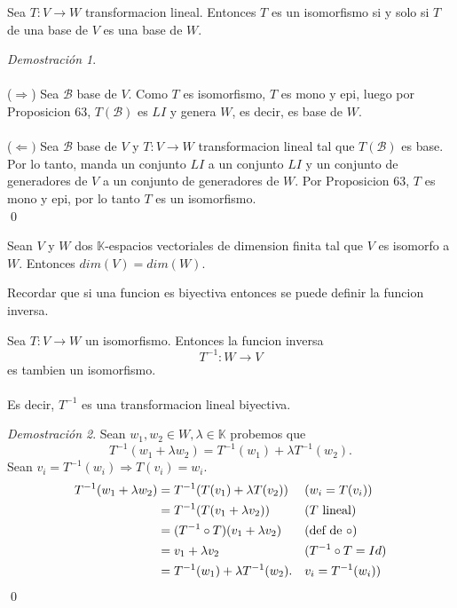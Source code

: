 \documentclass{article}
\theoremstyle{definition}
\theoremstyle{definition}
\theoremstyle{remark}
\newtheorem*{demo}{Demostración}
\begin{document}
\begin{corol}
Sea $T : V \to W$ transformacion lineal. Entonces $T$ es un isomorfismo si y solo si $T$ de una base de $V$ es una base de $W$.
\end{corol}
\begin{demo}\;\\\\
  ($\Rightarrow$) Sea $\mathcal{B}$ base de $V$. Como $T$ es isomorfismo, $T$ es mono y epi, luego por Proposicion 63, $T(\mathcal{B})$ es $LI$ y genera $W$, es decir, es base de $W$. \\\\
  ($\Leftarrow)$ Sea $\mathcal{B}$ base de $V$ y $T: V \to W$ transformacion lineal tal que $T(\mathcal{B})$ es base. Por lo tanto, manda un conjunto $LI$ a un conjunto $LI$ y un conjunto de generadores de $V$ a un conjunto de generadores de $W$. Por Proposicion 63, $T$ es mono y epi, por lo tanto $T$ es un isomorfismo. \\ \qed 
\end{demo}
\begin{corol}
  Sean $V$ y $W$ dos $\mathbb{K}$-espacios vectoriales de dimension finita tal que $V$ es isomorfo a $W$. Entonces $dim(V)=dim(W)$.
\end{corol}
Recordar que si una funcion es biyectiva entonces se puede definir la funcion inversa. 
 \begin{teo}
   Sea $T : V \to W$ un isomorfismo. Entonces la funcion inversa \[
     T^{-1}: W \to V 
   \]
   es tambien un isomorfismo. \\\\ Es decir, $T^{-1}$ es una transformacion lineal biyectiva.
 \end{teo}
 \begin{demo}
   Sean $w_1, w_2 \in W, \lambda \in \mathbb{K}$ probemos que \[
     T^{-1}(w_1+ \lambda w_2) = T^{-1}(w_1)+\lambda T^{-1}(w_2).
   \]
   Sean $v_i=T^{-1}(w_i)\Rightarrow T(v_i)=w_i$. \begin{align}
     T^{-1}(w_1+ \lambda w_2) &= T^{-1}(T(v_1)+\lambda T(v_2)) && (w_i=T(v_i)) \notag \\ 
                              &= T^{-1}(T(v_1+\lambda v_2)) && (T \text{ lineal}) \notag \\
                              &= (T^{-1} \circ T)(v_1+\lambda v_2) && \text{(def de }\circ)  \notag \\ 
                              &= v_1 + \lambda v_2 && (T^{-1}\circ T=Id) \notag \\
                              &= T^{-1}(w_1)+\lambda T^{-1}(w_2). && v_i=T^{-1}(w_i)) \notag 
   \end{align} \qed

 \end{demo}
\end{document}
